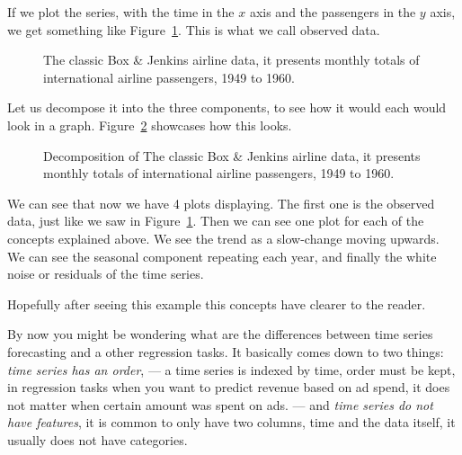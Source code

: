 \documentclass[journal]{IEEEtran}
\begin{document}
If we plot the series, with the time in the $x$ axis and the passengers in
the $y$ axis, we get something like Figure~\ref{fig:airpassenger}. This is
what we call observed data.

\begin{figure}[htbp]
  \centering
  
  \caption{The classic Box \& Jenkins airline data, it presents monthly
    totals of international airline passengers, 1949 to 1960.}
  \label{fig:airpassenger}
\end{figure}

Let us decompose it into the three components, to see how it would each would
look in a graph. Figure~\ref{fig:decompose} showcases how this looks.

\begin{figure}[htbp]
  \centering
  
  \caption{Decomposition of The classic Box \& Jenkins airline data, it
    presents monthly totals of international airline passengers, 1949 to
    1960.}
  \label{fig:decompose}
\end{figure}

We can see that now we have 4 plots displaying. The first one is the observed
data, just like we saw in Figure~\ref{fig:airpassenger}. Then we can see one
plot for each of the concepts explained above. We see the trend  as a
slow-change moving upwards. We can see the seasonal component repeating each
year, and finally the white noise or residuals of the time series.

Hopefully after seeing this example this concepts have clearer to the reader.

By now you might be wondering what are the differences between time series
forecasting and a other regression tasks. It basically comes down to two
things: \emph{time series has an order}, --- a time series is indexed by
time, order must be kept, in regression tasks when  you want to predict
revenue based on ad spend, it does not matter when certain amount was spent
on ads. --- and \emph{time series do not have features}, it is common to only
have two columns, time and the data itself, it usually does not have
categories.
\end{document}

